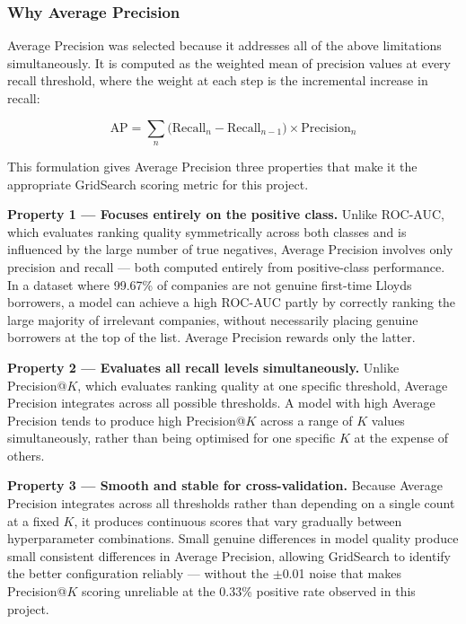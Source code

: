 \documentclass[ %
                    author={Natchalin Iwsakul \\ Inkaphol Siriwongwattana \\ Tanaphan Kummaraphat \\ Patorn Srisupap},
                supervisor={Fernando Moreno-Pino},
                    degree={MSc},
                     title={Propensity Modelling for SME Commercial Lending Using Open Public Data},
                  subtitle={Companies House filings and GDELT media coverage as predictors of first-time borrowing},
                      type={},
                      year={2026}]{dissertation}
\begin{document}
\subsubsection{Why Average Precision}

Average Precision was selected because it addresses all of
the above limitations simultaneously. It is computed as
the weighted mean of precision values at every recall
threshold, where the weight at each step is the incremental
increase in recall:

\begin{equation}
    \text{AP} =
    \sum_{n} \bigl(\text{Recall}_{n} - \text{Recall}_{n-1}
    \bigr) \times \text{Precision}_{n}
    \label{eq:ap_gridsearch}
\end{equation}

\noindent
This formulation gives Average Precision three properties
that make it the appropriate GridSearch scoring metric for
this project.

\textbf{Property 1 --- Focuses entirely on the positive
class.}
Unlike ROC-AUC, which evaluates ranking quality
symmetrically across both classes and is influenced by the
large number of true negatives, Average Precision involves
only precision and recall --- both computed entirely from
positive-class performance. In a dataset where 99.67\% of
companies are not genuine first-time Lloyds borrowers, a
model can achieve a high ROC-AUC partly by correctly
ranking the large majority of irrelevant companies, without
necessarily placing genuine borrowers at the top of the
list. Average Precision rewards only the latter.

\textbf{Property 2 --- Evaluates all recall levels
simultaneously.}
Unlike Precision@$K$, which evaluates ranking quality at
one specific threshold, Average Precision integrates
across all possible thresholds. A model with high Average
Precision tends to produce high Precision@$K$ across a
range of $K$ values simultaneously, rather than being
optimised for one specific $K$ at the expense of others.

\textbf{Property 3 --- Smooth and stable for
cross-validation.}
Because Average Precision integrates across all thresholds
rather than depending on a single count at a fixed $K$,
it produces continuous scores that vary gradually between
hyperparameter combinations. Small genuine differences in
model quality produce small consistent differences in
Average Precision, allowing GridSearch to identify the
better configuration reliably --- without the $\pm$0.01
noise that makes Precision@$K$ scoring unreliable at the
0.33\% positive rate observed in this project.
\end{document}
